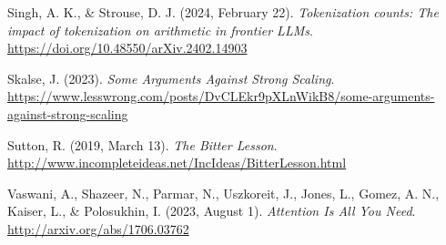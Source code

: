 \documentclass[
  a4paper, twoside, 10pt, titlepage]{book}
\newlength{\cslhangindent}
\newenvironment{CSLReferences}[2] %
 {\begin{list}{}{%
  \setlength{\itemindent}{0pt}
  \setlength{\leftmargin}{0pt}
  \setlength{\parsep}{0pt}
  \ifodd #1
   \setlength{\leftmargin}{\cslhangindent}
   \setlength{\itemindent}{-1\cslhangindent}
  \fi
  \setlength{\itemsep}{#2\baselineskip}}}
 {\end{list}}
\begin{document}
\begin{CSLReferences}{1}{0}
Singh, A. K., \& Strouse, D. J. (2024, February 22). \emph{Tokenization
counts: The impact of tokenization on arithmetic in frontier {LLMs}}.
\url{https://doi.org/10.48550/arXiv.2402.14903}

Skalse, J. (2023). \emph{Some {Arguments Against Strong Scaling}}.
\url{https://www.lesswrong.com/posts/DvCLEkr9pXLnWikB8/some-arguments-against-strong-scaling}

Sutton, R. (2019, March 13). \emph{The {Bitter Lesson}}.
\url{http://www.incompleteideas.net/IncIdeas/BitterLesson.html}

Vaswani, A., Shazeer, N., Parmar, N., Uszkoreit, J., Jones, L., Gomez,
A. N., Kaiser, L., \& Polosukhin, I. (2023, August 1). \emph{Attention
{Is All You Need}}. \url{http://arxiv.org/abs/1706.03762}

\end{CSLReferences}

\backmatter
\end{document}

